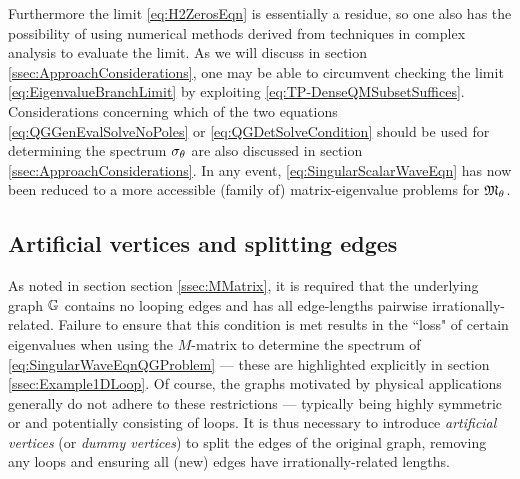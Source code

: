 Furthermore the limit \eqref{eq:H2ZerosEqn} is essentially a residue, so one also has the possibility of using numerical methods derived from techniques in complex analysis to evaluate the limit.
As we will discuss in section \ref{ssec:ApproachConsiderations}, one may be able to circumvent checking the limit \eqref{eq:EigenvalueBranchLimit} by exploiting \eqref{eq:TP-DenseQMSubsetSuffices}.
Considerations concerning which of the two equations \eqref{eq:QGGenEvalSolveNoPoles} or \eqref{eq:QGDetSolveCondition} should be used for determining the spectrum $\sigma_\theta$ are also discussed in section \ref{ssec:ApproachConsiderations}.
In any event, \eqref{eq:SingularScalarWaveEqn} has now been reduced to a more accessible (family of) matrix-eigenvalue problems for $\mathfrak{M}_\theta$.

\subsection{Artificial vertices and splitting edges} \label{ssec:ArtificialVertices}
As noted in section section \ref{ssec:MMatrix}, it is required that the underlying graph $\mathbb{G}$ contains no looping edges and has all edge-lengths pairwise irrationally-related.
Failure to ensure that this condition is met results in the ``loss" of certain eigenvalues when using the $M$-matrix to determine the spectrum of \eqref{eq:SingularWaveEqnQGProblem} --- these are highlighted explicitly in section \ref{ssec:Example1DLoop}.
Of course, the graphs motivated by physical applications generally do not adhere to these restrictions --- typically being highly symmetric or and potentially consisting of loops.
It is thus necessary to introduce \emph{artificial vertices} (or \emph{dummy vertices}) to split the edges of the original graph, removing any loops and ensuring all (new) edges have irrationally-related lengths.

